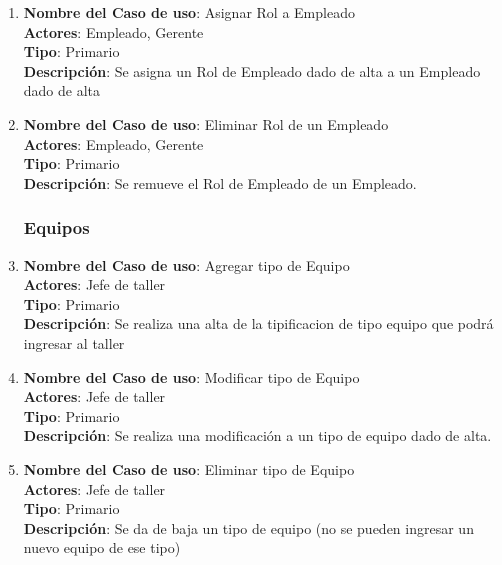 \documentclass[12pt]{extarticle}
\begin{document}
\begin{spacing}{1.2}
\begin{enumerate}
            \item 	\textbf{Nombre del Caso de uso}: Asignar Rol a Empleado\\
                    \textbf{Actores}: Empleado, Gerente\\
                    \textbf{Tipo}: Primario\\
                    \textbf{Descripción}: Se asigna un Rol de Empleado dado de alta a un Empleado dado de alta
            
            \item 	\textbf{Nombre del Caso de uso}: Eliminar Rol de un Empleado\\
                    \textbf{Actores}: Empleado, Gerente\\
                    \textbf{Tipo}: Primario\\
                    \textbf{Descripción}: Se remueve el Rol de Empleado de un Empleado.



            \subsubsection{Equipos}



            \item 	\textbf{Nombre del Caso de uso}: Agregar tipo de Equipo\\
                    \textbf{Actores}: Jefe de taller\\
                    \textbf{Tipo}: Primario\\
                    \textbf{Descripción}: Se realiza una alta de la tipificacion de tipo equipo que podrá ingresar al taller 
            
            \item 	\textbf{Nombre del Caso de uso}: Modificar tipo de Equipo\\
                    \textbf{Actores}: Jefe de taller\\
                    \textbf{Tipo}: Primario\\
                    \textbf{Descripción}: Se realiza una modificación a un tipo de equipo dado de alta.
            
            \item 	\textbf{Nombre del Caso de uso}: Eliminar tipo de Equipo\\
                    \textbf{Actores}: Jefe de taller\\
                    \textbf{Tipo}: Primario\\
                    \textbf{Descripción}: Se da de baja un tipo de equipo (no se pueden ingresar un nuevo equipo de ese tipo)
            

\end{enumerate}
\end{spacing}
\end{document}
